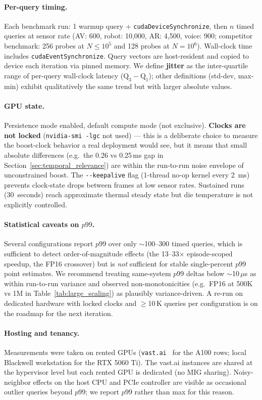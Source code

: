 \documentclass[11pt]{article}
\begin{document}
\paragraph{Per-query timing.} Each benchmark run: 1 warmup query +
\texttt{cudaDeviceSynchronize}, then $n$ timed queries at sensor rate
(AV: 600, robot: 10{,}000, AR: 4{,}500, voice: 900;
competitor benchmark: 256 probes at $N{\le}10^5$ and 128 probes at
$N{=}10^6$). Wall-clock time includes \texttt{cudaEventSynchronize}.
Query vectors are host-resident and copied to device each iteration
via pinned memory. We define \textbf{jitter} as the inter-quartile
range of per-query wall-clock latency
($\text{Q}_3 - \text{Q}_1$); other definitions (std-dev, max-min)
exhibit qualitatively the same trend but with larger absolute values.

\paragraph{GPU state.} Persistence mode enabled, default compute mode
(not exclusive). \textbf{Clocks are not locked} (\texttt{nvidia-smi
-lgc} not used) --- this is a deliberate choice to measure the
boost-clock behavior a real deployment would see, but it means that
small absolute differences (e.g.\ the 0.26 vs 0.25\,ms gap in
Section~\ref{sec:temporal_relevance}) are within the run-to-run
noise envelope of unconstrained boost. The \texttt{-{}-keepalive}
flag (1-thread no-op kernel every 2~ms) prevents clock-state drops
between frames at low sensor rates. Sustained runs (30~seconds)
reach approximate thermal steady state but die temperature is not
explicitly controlled.

\paragraph{Statistical caveats on $p99$.} Several configurations
report $p99$ over only $\sim$100--300 timed queries, which is
sufficient to detect order-of-magnitude effects (the 13--33$\times$
episode-scoped speedup, the FP16 crossover) but is \emph{not}
sufficient for stable single-percent $p99$ point estimates. We
recommend treating same-system $p99$ deltas below
$\sim$10\,$\mu$s as within run-to-run variance and observed
non-monotonicities (e.g.\ FP16 at 500K vs 1M in
Table~\ref{tab:large_scaling}) as plausibly variance-driven. A
re-run on dedicated hardware with locked clocks and $\geq$10\,K
queries per configuration is on the roadmap for the next iteration.

\paragraph{Hosting and tenancy.} Measurements were taken on rented
GPUs (\texttt{vast.ai}~\cite{vastai} for the A100 rows; local
Blackwell workstation for the RTX 5060 Ti). The vast.ai instances
are shared at the hypervisor level but each rented GPU is dedicated
(no MIG sharing). Noisy-neighbor effects on the host CPU and PCIe
controller are visible as occasional outlier queries beyond
$p99$; we report $p99$ rather than max for this reason.
\end{document}
